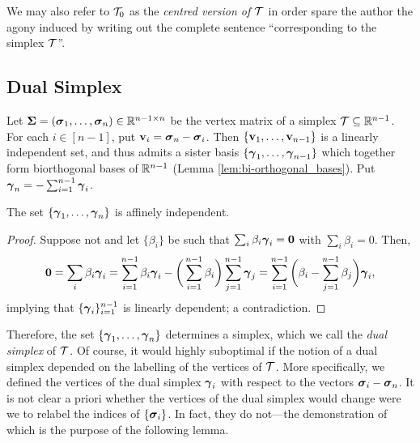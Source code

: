 We may also refer to $\mathcal{T}_0$ as the \emph{centred version of $\mathcal{T}$} in order  spare  the author the agony induced by writing out the complete  sentence ``corresponding to the simplex $\mathcal{T}$''. 

 

\subsection{Dual Simplex}
\label{sec:background_dual_simplex}
Let $\boldsymbol{\Sigma}=(\vb*{\sigma}_1,\dots,\vb*{\sigma}_n)\in\mathbb{R}^{n-1\times n}$ be the vertex matrix of a simplex $\mathcal{T}\subseteq\mathbb{R}^{n-1}$. For each $i\in[n-1]$, put $\vb{v}_i=\vb*{\sigma}_n-\vb*{\sigma}_i$. Then $\{\vb{v}_1,\dots,\vb{v}_{n-1}\}$ is a linearly independent set, and thus admits a sister basis $\{\vb*{\gamma}_1,\dots,\vb*{\gamma}_{n-1}\}$ which together form biorthogonal bases of $\mathbb{R}^{n-1}$ (Lemma \ref{lem:bi-orthogonal_bases}). Put $\vb*{\gamma}_n = -\sum_{i=1}^{n-1}\vb*{\gamma}_i$.  

\begin{claim}
The set 
$\{\vb*{\gamma}_1,\dots,\vb*{\gamma}_n\}$ is affinely independent. 
\end{claim}
\begin{proof}
Suppose not and let $\{\beta_i\}$ be such that $\sum_i \beta_i \vb*{\gamma}_i =\vb{0}$ with $\sum_i\beta_i=0$. Then, 
\[\vb{0} = \sum_i\beta_i\vb*{\gamma}_i = \sum_{i=1}^{n-1} \beta_i \vb*{\gamma}_i - \bigg(\sum_{i=1}^{n-1} \beta_i\bigg)\sum_{j=1}^{n-1}\vb*{\gamma}_j = \sum_{i=1}^{n-1}\bigg(\beta_i-\sum_{j=1}^{n-1}\beta_j\bigg)\vb*{\gamma}_i,\]
implying that $\{\vb*{\gamma}_i\}_{i=1}^{n-1}$ is linearly dependent; a contradiction.  
\end{proof}

Therefore, the set $\{\vb*{\gamma}_1,\dots,\vb*{\gamma}_n\}$ determines a simplex, which we call the \emph{dual simplex} of $\mathcal{T}$. Of course, it would highly suboptimal if the notion of a dual simplex depended on the labelling of the vertices of $\mathcal{T}$. More specifically, we defined the vertices of the dual simplex $\vb*{\gamma}_i$ with respect to the vectors $\vb*{\sigma}_i-\vb*{\sigma}_n$. It is not clear a priori whether the vertices of the dual simplex would change were we to relabel the indices of $\{\vb*{\sigma}_i\}$. In fact, they do not---the demonstration of which is the purpose of the following lemma. 

